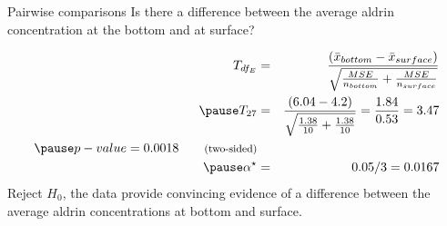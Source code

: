 \documentclass[
  ignorenonframetext,
]{beamer}
\begin{document}
\begin{frame}{Pairwise comparisons}
\protect\hypertarget{pairwise-comparisons}{}
\alert{Is there a difference between the average aldrin concentration at the bottom and at surface?}

\pause

\begin{eqnarray*}
T_{df_E} &=& \frac{(\bar{x}_{bottom} - \bar{x}_{surface})}{\sqrt{ \frac{MSE}{n_{bottom}} + \frac{MSE}{n_{surface}} }} \\ 
\pause
T_{27} &=& \frac{( 6.04 - 4.2 )}{\sqrt{ \frac{1.38}{10} + \frac{1.38}{10} }} = \frac{1.84}{0.53}  =3.47 \\
\pause
p-value = 0.0018 \qquad \text{\footnotesize (two-sided)} \\
\pause
\alpha^\star &=& 0.05 / 3 = 0.0167
\end{eqnarray*} \pause \small Reject \(H_0\), the data provide
convincing evidence of a difference between the average aldrin
concentrations at bottom and surface.
\end{frame}
\end{document}
